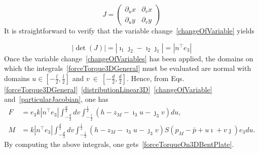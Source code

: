 \documentclass[12pt,a4paper,twoside]{article}
\begin{document}
\begin{equation}
\label{generalJacobian}
J =
\begin{pmatrix}
\partial_u x &  \partial_v x  \\
\partial_u y & \partial_v y
\end{pmatrix}
\end{equation}
It is straightforward to verify that the variable change~\eqref{changeOfVariable} yields

\begin{equation}
\label{particularJacobian}
|\det(J)| = |\imath_1 \jmath_2 - \imath_2 \jmath_1| = |n^\top e_3|
\end{equation}
Once the variable change~\eqref{changeOfVariables} has been applied, the domains on which the integrals~\eqref{forceTorque3DGeneral} must be evaluated are normal with domains $u\in \left[-\frac{l}{2},\frac{l}{2}\right]$ and
$v~\in~\left[-\frac{d}{2},\frac{d}{2}\right]$. Hence, from Eqs.~ \eqref{forceTorque3DGeneral}~\eqref{distributionLinear3D}~\eqref{changeOfVariable} and~\eqref{particularJacobian}, one has
\begin{subequations}
\label{forceTorque3DGeneralVC}
    \begin{alignat}{2}
\label{eq:forcesDist3DEVC}
F &= e_3 k |n^\top e_3| \int_{-\frac{d}{2}}^{\frac{d}{2}} dv \int_{-\frac{l}{2}}^{\frac{l}{2}} (h-z_M -\imath_3 u - \jmath_3 v)  du, \\
\label{eq:torqueDist3DEVC}
M &= k |n^\top e_3|
\int_{-\frac{d}{2}}^{\frac{d}{2}} dv \int_{-\frac{l}{2}}^{\frac{l}{2}}
(h{-}z_M {-}\imath_3 u {-} \jmath_3 v) S(p_M - \bar{p} + u \imath + v \jmath)e_3
  du.
    \end{alignat}
\end{subequations}
By computing the above integrals, one gets~\eqref{forceTorqueOn3DBentPlate}.
\end{document}
